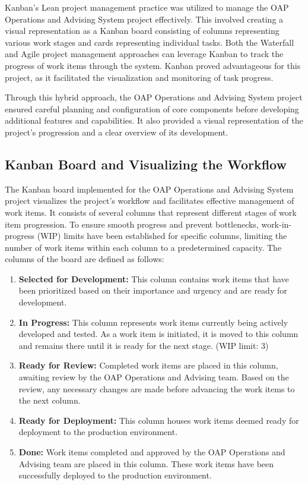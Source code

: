 \documentclass[12pt]{article}
\begin{document}
Kanban's Lean project management practice was utilized to manage the OAP Operations and Advising System project effectively. This involved creating a visual representation as a Kanban board consisting of columns representing various work stages and cards representing individual tasks. Both the Waterfall and Agile project management approaches can leverage Kanban to track the progress of work items through the system. Kanban proved advantageous for this project, as it facilitated the visualization and monitoring of task progress.

Through this hybrid approach, the OAP Operations and Advising System project ensured careful planning and configuration of core components before developing additional features and capabilities. It also provided a visual representation of the project's progression and a clear overview of its development.

\subsection{Kanban Board and Visualizing the Workflow} The Kanban board implemented for the OAP Operations and Advising System project visualizes the project's workflow and facilitates effective management of work items. It consists of several columns that represent different stages of work item progression. To ensure smooth progress and prevent bottlenecks, work-in-progress (WIP) limits have been established for specific columns, limiting the number of work items within each column to a predetermined capacity. The columns of the board are defined as follows:

\begin{enumerate}[label=(\roman*)] 
    \item \textbf{Selected for Development:} This column contains work items that have been prioritized based on their importance and urgency and are ready for development. 
    \item \textbf{In Progress:} This column represents work items currently being actively developed and tested. As a work item is initiated, it is moved to this column and remains there until it is ready for the next stage. (WIP limit: 3) 
    \item \textbf{Ready for Review:} Completed work items are placed in this column, awaiting review by the OAP Operations and Advising team. Based on the review, any necessary changes are made before advancing the work items to the next column. 
    \item \textbf{Ready for Deployment:} This column houses work items deemed ready for deployment to the production environment. 
    \item \textbf{Done:} Work items completed and approved by the OAP Operations and Advising team are placed in this column. These work items have been successfully deployed to the production environment. 
\end{enumerate}
\end{document}

